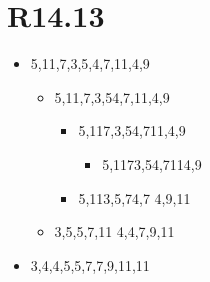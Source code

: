\documentclass{article}
\begin{document}
\section{R14.13}
\begin{itemize}
 \item 5,11,7,3,5,4,7,11,4,9
       \begin{itemize}
        \item 5,11,7,3,5\hspace{2cm}4,7,11,4,9
              \begin{itemize}
               \item 5,11\hspace{2cm}7,3,5\hspace{2cm}4,7\hspace{2cm}11,4,9
                     \begin{itemize}
                      \item 5,11\hspace{2cm}7\hspace{2cm}3,5\hspace{2cm}4,7\hspace{2cm}11\hspace{2cm}4,9
                     \end{itemize}
               \item 5,11\hspace{2cm}3,5,7\hspace{2cm}4,7 \hspace{2cm}4,9,11
              \end{itemize}
              \item 3,5,5,7,11\hspace{2cm} 4,4,7,9,11
       \end{itemize}
       \item 3,4,4,5,5,7,7,9,11,11
\end{itemize}
\end{document}
